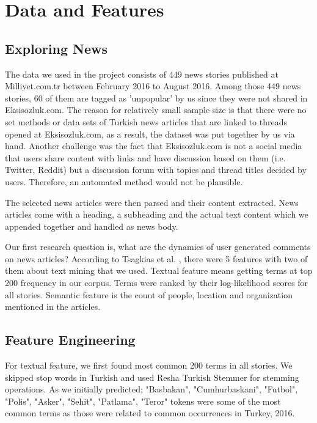 \documentclass[conference]{IEEEtran}
\begin{document}
\section{Data and Features}
\subsection{Exploring News}
The data we used in the project consists of 449 news stories published at Milliyet.com.tr between February 2016 to August 2016. Among those 449 news stories, 60 of them are tagged as 'unpopular' by us since they were not shared in Eksisozluk.com. The reason for relatively small sample size is that there were no set methods or data sets of Turkish news articles that are linked to threads opened at Eksisozluk.com, as a result, the dataset was put together by us via hand. Another challenge was the fact that Eksisozluk.com is not a social media that users share content with links and have discussion based on them (i.e. Twitter, Reddit) but a discussion forum with topics and thread titles decided by users. Therefore, an automated method would not be plausible.

The selected news articles were then parsed and their content extracted. News articles come with a heading, a subheading and the actual text content which we appended together and handled as news body.

Our first research question is, what are the dynamics of user generated comments on news articles? According to Tsagkias et al. \cite{tsagkias_predicting_2009}, there were 5 features with two of them about text mining that we used. Textual feature means getting terms at top 200 frequency in our corpus. Terms were ranked by their log-likelihood scores for all stories. Semantic feature is the count of people, location and organization mentioned in the articles.

\subsection{Feature Engineering}
For textual feature, we first found most common 200 terms in all stories. We skipped stop words in Turkish and used Resha Turkish Stemmer \cite{resha-turkish-stemmer} for stemming operations. As we initially predicted; "Basbakan", "Cumhurbaskani", "Futbol", "Polis", "Asker", "Sehit", "Patlama", "Teror" tokens were some of the most common terms as those were related to common occurrences in Turkey, 2016.
\end{document}
